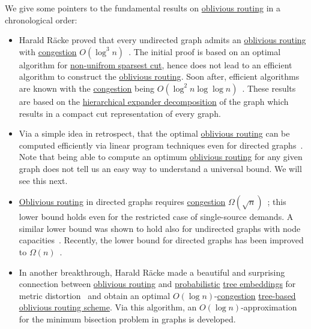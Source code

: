 We give some pointers to the fundamental results on \hyperref[prb:oblivious-routing]{oblivious routing} in a chronological order:
\begin{itemize}
	\item Harald Räcke proved that every undirected graph admits an \hyperref[def:oblivious-routing-scheme]{oblivious routing} with \hyperref[def:congestion-of-oblivious-routing]{congestion} \(O(\log ^3 n)\)~\cite{racke2002minimizing}. The initial proof is based on an optimal algorithm for \hyperref[prb:non-uniform-sparsest-cut]{non-unifrom sparsest cut}, hence does not lead to an efficient algorithm to construct the \hyperref[def:oblivious-routing-scheme]{oblivious routing}. Soon after, efficient algorithms are known with the \hyperref[def:congestion-of-oblivious-routing]{congestion} being \(O(\log ^2 n \log \log n)\)~\cite{bienkowski2003practical,harrelson2003polynomial}. These results are based on the \hyperref[thm:hierarchical-expander-decomposition]{hierarchical expander decomposition} of the graph which results in a compact cut representation of every graph.
	\item Via a simple idea in retrospect, that the optimal \hyperref[def:oblivious-routing-scheme]{oblivious routing} can be computed efficiently via linear program techniques even for directed graphs~\cite{azar2003optimal}. Note that being able to compute an optimum \hyperref[def:oblivious-routing-scheme]{oblivious routing} for any given graph does not tell us an easy way to understand a universal bound. We will see this next.
	\item \hyperref[def:oblivious-routing-scheme]{Oblivious routing} in directed graphs requires \hyperref[def:congestion-of-oblivious-routing]{congestion} \(\Omega (\sqrt{n} )\)~\cite{azar2003optimal}; this lower bound holds even for the restricted case of single-source demands. A similar lower bound was shown to hold also for undirected graphs with node capacities~\cite{hajiaghayi2007oblivious}. Recently, the lower bound for directed graphs has been improved to \(\Omega (n)\)~\cite{ene2016routing}.
	\item In another breakthrough, Harald Räcke made a beautiful and surprising connection between \hyperref[def:oblivious-routing-scheme]{oblivious routing} and \hyperref[def:probabilistic-approximation]{probabilistic} \hyperref[prb:tree-embedding]{tree embeddings} for metric distortion~\cite{racke2008optimal} and obtain an optimal \(O(\log n)\)-\hyperref[def:congestion-of-oblivious-routing]{congestion} \hyperref[not:tree-based-oblivious-routing]{tree-based oblivious routing scheme}. Via this algorithm, an \(O(\log n)\)-approximation for the minimum bisection problem in graphs is developed.
\end{itemize}

